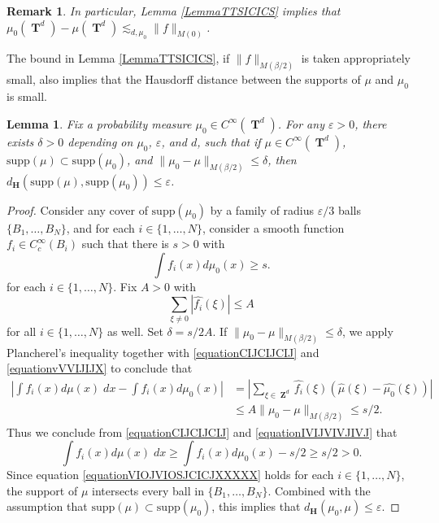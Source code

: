 \documentclass[12pt,reqno]{article}
\numberwithin{equation}{section}
\DeclareMathOperator{\ZZ}{\mathbf{Z}}
\DeclareMathOperator{\TT}{\mathbf{T}}
\newtheorem{lemma}[theorem]{Lemma}
\newtheorem{remark}[theorem]{Remark}
\numberwithin{theorem}{section}
\begin{document}
\begin{remark} \label{remarkFOIJIOSJCIOSJ}
    In particular, Lemma \ref{LemmaTTSICICS} implies that $\mu_0(\TT^d) - \mu(\TT^d) \lesssim_{d,\mu_0} \| f \|_{M(0)}$.
\end{remark}

The bound in Lemma \ref{LemmaTTSICICS}, if $\| f \|_{M(\beta/2)}$ is taken appropriately small, also implies that the Hausdorff distance between the supports of $\mu$ and $\mu_0$ is small.

\begin{lemma} \label{LemmaTAOIAWOIDJ12301}
    Fix a probability measure $\mu_0 \in C^\infty(\TT^d)$. For any $\varepsilon > 0$, there exists $\delta > 0$ depending on $\mu_0$, $\varepsilon$, and $d$, such that if $\mu \in C^\infty(\TT^d)$, $\text{supp}(\mu) \subset \text{supp}(\mu_0)$, and $\| \mu_0 - \mu \|_{M(\beta/2)} \leq \delta$, then $d_\mathbf{H}(\text{supp}(\mu),\text{supp}(\mu_0)) \leq \varepsilon$.
\end{lemma}
\begin{proof}
    Consider any cover of $\text{supp}(\mu_0)$ by a family of radius $\varepsilon/3$ balls $\{ B_1,\dots,B_N \}$, and for each $i \in \{ 1, \dots, N \}$, consider a smooth function $f_i \in C_c^\infty(B_i)$ such that there is $s > 0$ with
    \begin{equation} \label{equationCIJCIJCIJ}
        \int f_i(x) d\mu_0(x) \geq s.
    \end{equation}
    for each $i \in \{ 1, \dots, N \}$. Fix $A > 0$ with
    \begin{equation} \label{equationvVVIJIJX}
        \sum_{\xi \neq 0} |\widehat{f_i}(\xi)| \leq A
    \end{equation}
    for all $i \in \{ 1, \dots, N \}$ as well. Set $\delta = s/2A$. If $\| \mu_0 - \mu \|_{M(\beta/2)} \leq \delta$, we apply Plancherel's inequality together with \eqref{equationCIJCIJCIJ} and \eqref{equationvVVIJIJX} to conclude that
    \begin{equation} \label{equationIVIJVIVJIVJ}
    \begin{split}
        \left| \int f_i(x) d\mu(x)\; dx - \int f_i(x) d\mu_0(x) \right| &= \left| \sum_{\xi \in \ZZ^d} \widehat{f_i}(\xi) \left( \widehat{\mu}(\xi) - \widehat{\mu_0}(\xi) \right) \right|\\
        &\leq A \| \mu_0 - \mu \|_{M(\beta/2)} \leq s/2.
    \end{split}
    \end{equation}
    Thus we conclude from \eqref{equationCIJCIJCIJ} and \eqref{equationIVIJVIVJIVJ} that
    \begin{equation} \label{equationVIOJVIOSJCICJXXXXX}
        \int f_i(x) d\mu(x)\; dx \geq \int f_i(x) d\mu_0(x) - s/2 \geq s/2 > 0.
    \end{equation}
    Since equation \eqref{equationVIOJVIOSJCICJXXXXX} holds for each $i \in \{ 1,\dots, N \}$, the support of $\mu$ intersects every ball in $\{ B_1, \dots, B_N \}$. Combined with the assumption that $\text{supp}(\mu) \subset \text{supp}(\mu_0)$, this implies that $d_\mathbf{H}(\mu_0,\mu) \leq \varepsilon$.
\end{proof}
\end{document}
